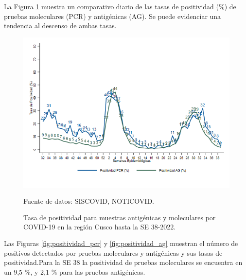 \documentclass[12pt,a4paper,openany]{book}
\begin{document}
	\pagebreak
	
	
	La Figura \ref{fig:total_muestras_procesada} muestra un comparativo diario de las tasas de positividad ($\%$) de pruebas moleculares (PCR) y antigénicas (AG). Se puede evidenciar una tendencia al descenso de ambas tasas.
	
	\begin{figure}[h]
		\caption{Tasa de positividad para muestras antigénicas y moleculares por COVID-19 en la región Cusco hasta la SE 38-2022. }\label{fig:total_muestras_procesada}
		\begin{center}
			\includegraphics[width=0.80\linewidth]{../figuras/positividad_diaria_2021_2022.png}
		\end{center}
		{\footnotesize {Fuente de datos: SISCOVID, NOTICOVID.}}
	\end{figure}
	
	
	
	Las Figuras \ref{fig:positividad_pcr} y \ref{fig:positividad_ag} muestran el número de positivos detectados por pruebas moleculares y antigénicas y sus tasas de positividad.Para la SE 38 la positividad de pruebas moleculares se encuentra en un 9,5 $\%$, y 2,1 $\%$ para las pruebas antigénicas.
	
\end{document}
